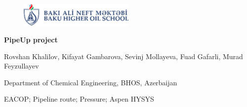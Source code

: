 \documentclass[12pt]{article}
\begin{document}
\begin{center}


	\begin{figure}[h!]
		\centering
		\includegraphics[width=0.5\textwidth]{assets/images/banm.png}
		
	 \end{figure}


	
{\fontsize{14pt}{14pt}\selectfont

\textbf{PipeUp project}

}	

\end{center}

Rovshan Khalilov,
Kifayat Gambarova, 
Sevinj Mollayeva,
Fuad Gafarli,
Murad Feyzullayev

\begin{center}
	Department of Chemical Engineering, BHOS, Azerbaijan

	EACOP; Pipeline route; Pressure; Aspen HYSYS
\end{center}
\end{document}
